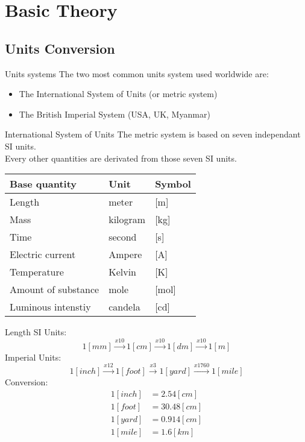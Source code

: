 \documentclass[aspectratio=1610,english,12pt]{beamer}
\begin{document}
\section{Basic Theory}

\subsection{Units Conversion}

\begin{frame}{Units systems}  
	The two most common units system used worldwide are:
	\begin{itemize}
		\item The International System of Units (or metric system)
		\item The British Imperial System (USA, UK, Myanmar)
	\end{itemize} 
\end{frame}

\begin{frame}{International System of Units}
	The metric system is based on seven independant SI units.\\
	Every other quantities are derivated from those seven SI units.\\
	\vspace{1em}
	\centering
	\begin{tabular}{| l | l | l |}
		\hline
		Base quantity & Unit & Symbol\\ \hline
		Length & meter & [m]\\
		Mass & kilogram & [kg]\\
		Time & second & [s]\\
		Electric current & Ampere & [A]\\
		Temperature & Kelvin & [K]\\
		Amount of substance & mole & [mol]\\
		Luminous intenstiy & candela & [cd]\\
		\hline
	\end{tabular}
\end{frame}

\begin{frame}{Length}
	SI Units:
	\[
		1[mm] \xrightarrow{x10} 1[cm] \xrightarrow{x10} 1[dm] \xrightarrow{x10} 1[m]
	\]
	Imperial Units:
	\[
		1[inch] \xrightarrow{x12} 1[foot] \xrightarrow{x3} 1[yard] \xrightarrow{x1760} 1[mile]
	\]
	Conversion:
	\begin{align*}
				1[inch] &= 2.54[cm]\\
				1[foot] &= 30.48[cm]\\
				1[yard] &= 0.914[cm]\\
				1[mile] &= 1.6[km]
	\end{align*}			
\end{frame}
\end{document}
